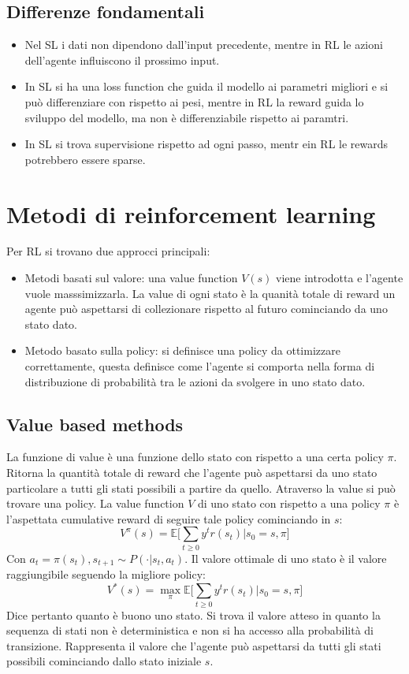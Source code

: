 	\subsection{Differenze fondamentali}
	\begin{itemize}
		\item Nel SL i dati non dipendono dall'input precedente, mentre in RL le azioni dell'agente influiscono il prossimo input.
		\item In SL si ha una loss function che guida il modello ai parametri migliori e si pu\`o differenziare con rispetto ai pesi, mentre in RL la reward guida lo sviluppo del modello, ma non \`e differenziabile rispetto ai paramtri.
		\item In SL si trova supervisione rispetto ad ogni passo, mentr ein RL le rewards potrebbero essere sparse.
	\end{itemize}

\section{Metodi di reinforcement learning}
Per RL si trovano due approcci principali:
\begin{itemize}
	\item Metodi basati sul valore: una value function $V(s)$ viene introdotta e l'agente vuole masssimizzarla.
		La value di ogni stato \`e la quanit\`a totale di reward un agente pu\`o aspettarsi di collezionare rispetto al futuro cominciando da uno stato dato.
	\item Metodo basato sulla policy: si definisce una policy da ottimizzare correttamente, questa definisce come l'agente si comporta nella forma di distribuzione di probabilit\`a tra le azioni da svolgere in uno stato dato.
\end{itemize}

	\subsection{Value based methods}
	La funzione di value \`e una funzione dello stato con rispetto a una certa policy $\pi$.
	Ritorna la quantit\`a totale di reward che l'agente pu\`o aspettarsi da uno stato particolare a tutti gli stati possibili a partire da quello.
	Atraverso la value si pu\`o trovare una policy.
	La value function $V$ di uno stato con rispetto a una policy $\pi$ \`e l'aspettata cumulative reward di seguire tale policy cominciando in $s$:
	$$V^\pi(s) = \mathbb{E}\biggl[\sum\limits_{t\ge 0} y^tr(s_t)|s_0 = s,\pi\biggr]$$
	Con $a_t = \pi(s_t), s_{t+1}\sim P(\cdot|s_t, a_t)$.
	Il valore ottimale di uno stato \`e il valore raggiungibile seguendo la migliore policy:
	$$V^*(s) = \max_\pi\mathbb{E}\biggl[\sum\limits_{t\ge 0} y^tr(s_t)|s_0 = s,\pi\biggr]$$
	Dice pertanto quanto \`e buono uno stato.
	Si trova il valore atteso in quanto la sequenza di stati non \`e deterministica e non si ha accesso alla probabilit\`a di transizione.
	Rappresenta il valore che l'agente pu\`o aspettarsi da tutti gli stati possibili cominciando dallo stato iniziale $s$.

